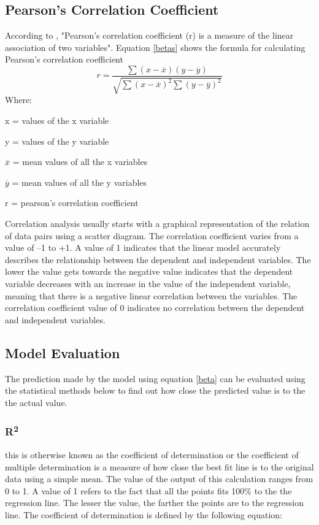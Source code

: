 \documentclass[conference]{IEEEtran}
\begin{document}
\subsection{Pearson's Correlation Coefficient}
According to \cite{ref1_pearson}, "Pearson's correlation coefficient (r) is a measure of the linear association of two variables". Equation \eqref{betas} shows the formula for calculating Pearson's correlation coefficient 
	\begin{equation}
		r = \frac{\sum{}(x-\overline{x})(y-\overline{y})}{\sqrt{\sum{}(x-\overline{x})^2\sum{}(y-\overline{y})^2}}\label{betas}
	\end{equation}	
	Where:
	\begin{description}
		\item x = values of the x variable
		\item y = values of the y variable
		\item $\overline{x}$ = mean values of all the x variables
		\item $\overline{y}$ = mean values of all the y variables
		\item r = pearson's correlation coefficient
	\end{description}
	 
Correlation analysis usually starts with a graphical representation of the relation of data pairs using a scatter diagram. The correlation coefficient varies from a value of –1 to +1.  A value of 1 indicates that the linear model accurately describes the relationship between the dependent and independent variables. The lower the value gets towards the negative value indicates that the dependent variable decreases with an increase in the value of the independent variable, meaning that there is a negative linear correlation between the variables.
The correlation coefficient value of 0 indicates no correlation between the dependent and independent variables.
\subsection{Model Evaluation}
The prediction made by the model using equation \eqref{beta} can be evaluated using the statistical methods below to find out how close the predicted value is to the the actual value.
\subsubsection{R\textsuperscript{2}}
this is otherwise known as the coefficient of determination or the coefficient of multiple determination is a measure of how close the best fit line is to the original data using a simple mean. The value of the output of this calculation ranges from 0 to 1\cite{DAE79009}. A value of 1 refers to the fact that all the points fits 100$\%$ to the the regression line. The lesser the value, the farther the points are to the regression line. The coefficient of determination is defined by the following equation:
\end{document}
